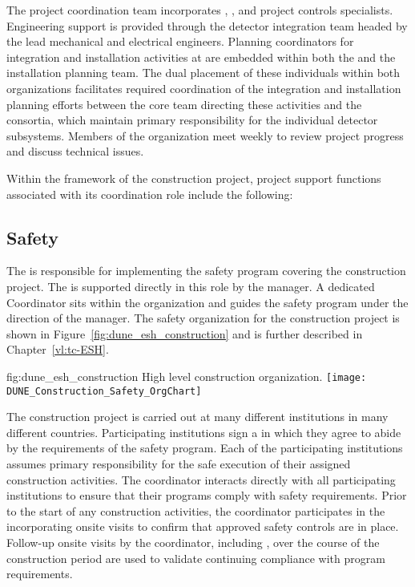 The  project coordination team incorporates , 
, and project controls specialists.  Engineering support 
is provided through the  detector integration team 
headed by the lead  mechanical and electrical engineers.
Planning coordinators for integration and installation activities 
at  are embedded within both the  and the 
 installation planning team.  The dual placement of 
these individuals within both organizations facilitates required 
coordination of the integration and installation planning 
efforts between the core team directing these activities and the 
 consortia, which maintain primary responsibility for 
the individual detector subsystems.  Members of the  
organization meet weekly to review project progress and discuss 
technical issues. 
     
Within the framework of the   construction 
project,  project support functions associated with its 
coordination role include the following:

\subsection{Safety}

The  is responsible for implementing the safety program
covering the  construction project.  The  is
supported directly in this role by the  
manager.  A dedicated   Coordinator sits within
the  organization and guides the  safety program
under the direction of the   manager. The
safety organization for the  construction project is shown
in Figure~\ref{fig:dune_esh_construction} and is further described in
Chapter~\ref{vl:tc-ESH}.
\begin{dunefigure}{fig:dune_esh_construction}
  {High level  construction  organization.}
  \texttt{[image: DUNE\_Construction\_Safety\_OrgChart]}
\end{dunefigure}

The  construction project is carried out at many different
institutions in many different countries.  Participating institutions
sign a  in which they agree to abide by the requirements of
the  safety program.  Each of the participating
institutions assumes primary responsibility for the safe execution of
their assigned construction activities.  The  
coordinator interacts directly with all participating institutions to
ensure that their programs comply with  safety
requirements.  Prior to the start of any construction activities, the
  coordinator participates in the 
incorporating onsite visits to confirm that approved safety controls
are in place.  Follow-up onsite visits by the  
coordinator, including , over the course of the
construction period are used to validate continuing compliance with
program requirements.

